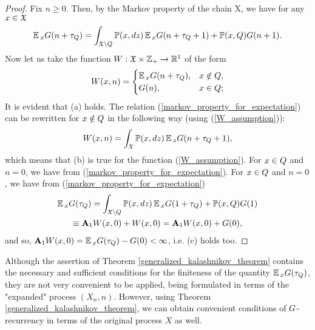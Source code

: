\begin{proof}
		Fix $n \geq 0$. Then, by the Markov property of the chain X, we have for any $x \in \mathfrak{X}$
		\begin{gather}
		\operatorname*{\mathbb{E}}{}_{x}G(n + \tau_{Q}) = \int_{\mathfrak{X}\backslash Q}\operatorname*{\mathbb{P}}(x, dz)\operatorname*{\mathbb{E}}{}_{x}G(n + \tau_{Q} + 1) + \operatorname*{\mathbb{P}}(x, Q)G(n+1).
		\label{markov_property_for_expectation}
		\end{gather}
		Now let us take the function $W : \mathfrak{X} \times \mathbb{Z}_{+} \xrightarrow{} \mathbb{R}^{1}$ of the form
		\begin{gather}
		W(x, n) = \begin{cases}
		\operatorname*{\mathbb{E}}{}_{x}G(n + \tau_{Q}), & x \notin Q,\\
		G(n), & x \in Q;
		\end{cases}
		\label{W_assumption}
		\end{gather}
		It is evident that (a) holds. The relation (\ref{markov_property_for_expectation}) can be rewritten for $x \notin Q$ in the following way (using (\ref{W_assumption})):
		\begin{gather*}
		W(x, n) = \int_{\mathfrak{X}}\operatorname*{\mathbb{P}}(x, dz)\operatorname*{\mathbb{E}}{}_{z}G(n + \tau_{Q} + 1),
		\end{gather*}
		which means that (b) is true for the function (\ref{W_assumption}). For $x \in Q$ and $n = 0$, we have from (\ref{markov_property_for_expectation}). For $x \in Q$ and $n = 0$, we have from (\ref{markov_property_for_expectation})
		\begin{gather*}
		\operatorname*{\mathbb{E}}{}_{x}G(\tau_{Q}) = \int_{\mathfrak{X} \backslash Q}\operatorname*{\mathbb{P}}(x, dz)\operatorname*{\mathbb{E}}{}_{x}G(1 + \tau_{Q}) + \operatorname*{\mathbb{P}}(x, Q)G(1) \\ \equiv \mathbf{A}_{1}W(x, 0) + W(x, 0) = \mathbf{A}_{1}W(x, 0) + G(0),
		\end{gather*}
		and so, $\mathbf{A}_{1}W(x, 0) = \operatorname*{\mathbb{E}}{}_{x}G(\tau_{Q}) - G(0) < \infty$, i.e. (c) holds too.
	\end{proof}
	
	Although the assertion of Theorem \ref{generalized_kalashnikov_theorem} contains the necessary and sufficient conditions for the finiteness of the quantity $\operatorname*{\mathbb{E}}{}_{x}G(\tau_{Q})$, they are not very convenient to be applied, being formulated in terms of the "expanded"$ $ process $(X_{n}, n)$. However, using Theorem \ref{generalized_kalashnikov_theorem}, we can obtain convenient conditions of $G$-recurrency in terms of the original process $X$ as well.
	
